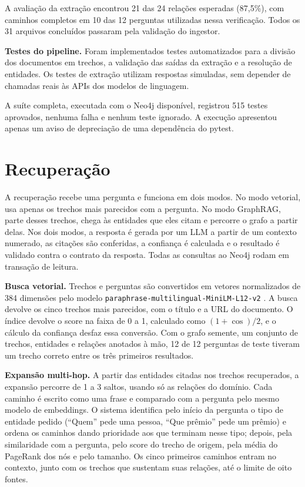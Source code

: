 \documentclass[12pt]{article}
\begin{document}
A avaliação da extração encontrou 21 das 24 relações esperadas
(87,5\%), com caminhos completos em 10 das 12 perguntas
utilizadas nessa verificação. Todos os 31 arquivos concluídos
passaram pela validação do ingestor.

\textbf{Testes do pipeline.} Foram implementados testes
automatizados para a divisão dos documentos em trechos,
a validação das saídas da extração e a resolução de
entidades. Os testes de extração utilizam respostas
simuladas, sem depender de chamadas reais às APIs dos
modelos de linguagem.

A suíte completa, executada com o Neo4j disponível,
registrou 515 testes aprovados, nenhuma falha e nenhum
teste ignorado. A execução apresentou apenas um aviso
de depreciação de uma dependência do pytest.

\section{Recuperação}
\label{sec:recuperacao}

A recuperação recebe uma pergunta e funciona em dois modos. No modo vetorial, usa apenas
os trechos mais parecidos com a pergunta. No modo GraphRAG, parte desses trechos, chega às
entidades que eles citam e percorre o grafo a partir delas. Nos dois modos, a resposta é
gerada por um LLM a partir de um contexto numerado, as citações são conferidas, a
confiança é calculada e o resultado é validado contra o contrato da resposta. Todas as
consultas ao Neo4j rodam em transação de leitura.

\textbf{Busca vetorial.} Trechos e perguntas são convertidos em vetores normalizados de 384
dimensões pelo modelo \texttt{paraphrase-multilingual-MiniLM-L12-v2}
\cite{reimers2019sbert,reimers2020multilingual}. A busca devolve os cinco trechos mais
parecidos, com o título e a URL do documento. O índice devolve o score na faixa de 0 a 1,
calculado como $(1+\cos)/2$, e o cálculo da confiança desfaz essa conversão. Com o grafo
semente, um conjunto de trechos, entidades e relações anotados à mão, 12 de 12 perguntas
de teste tiveram um trecho correto entre os três primeiros resultados.

\textbf{Expansão multi-hop.} A partir das entidades citadas nos trechos recuperados, a
expansão percorre de 1 a 3 saltos, usando só as relações do domínio. Cada caminho é escrito
como uma frase e comparado com a pergunta pelo mesmo modelo de embeddings. O sistema
identifica pelo início da pergunta o tipo de entidade pedido (``Quem'' pede uma pessoa,
``Que prêmio'' pede um prêmio) e ordena os caminhos dando prioridade aos que terminam
nesse tipo; depois, pela similaridade com a pergunta, pelo score do trecho de origem, pela
média do PageRank dos nós e pelo tamanho. Os cinco primeiros caminhos entram no contexto,
junto com os trechos que sustentam suas relações, até o limite de oito fontes.
\end{document}
